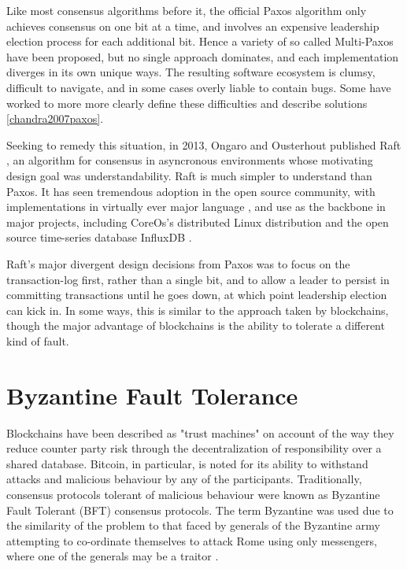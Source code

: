 Like most consensus algorithms before it, the official Paxos algorithm only achieves consensus on one bit at a time,
and involves an expensive leadership election process for each additional bit. 
Hence a variety of so called Multi-Paxos have been proposed, but no single approach dominates, 
and each implementation diverges in its own unique ways. 
The resulting software ecosystem is clumsy, difficult to navigate, and in some cases overly liable to contain bugs.
Some have worked to more more clearly define these difficulties 
and describe solutions \ref{chandra2007paxos}.

Seeking to remedy this situation, in 2013, Ongaro and Ousterhout published Raft \cite{raft},
an algorithm for consensus in asyncronous environments whose motivating design goal was understandability.
Raft is much simpler to understand than Paxos.
It has seen tremendous adoption in the open source community, 
with implementations in virtually ever major language \cite{raft.github.io},
and use as the backbone in major projects, 
including CoreOs's distributed Linux distribution \cite{coreos_raft} and the open source time-series database InfluxDB \cite{influxdb_raft}.

Raft's major divergent design decisions from Paxos was to focus on the transaction-log first, rather than a single bit,
and to allow a leader to persist in committing transactions until he goes down, 
at which point leadership election can kick in. 
In some ways, this is similar to the approach taken by blockchains, 
though the major advantage of blockchains is the ability to tolerate a different kind of fault.

\section{Byzantine Fault Tolerance}

Blockchains have been described as "trust machines" \cite{economist_blockchains} on account of the way they reduce counter party risk through the decentralization of responsibility over a shared database.
Bitcoin, in particular, is noted for its ability to withstand attacks and malicious behaviour by any of the participants. 
Traditionally, consensus protocols tolerant of malicious behaviour were known as Byzantine Fault Tolerant (BFT) consensus protocols.
The term Byzantine was used due to the similarity of the problem to that faced by generals of the Byzantine army attempting to co-ordinate themselves to attack Rome using only messengers,
where one of the generals may be a traitor \cite{lamport1982Byzantine}.

